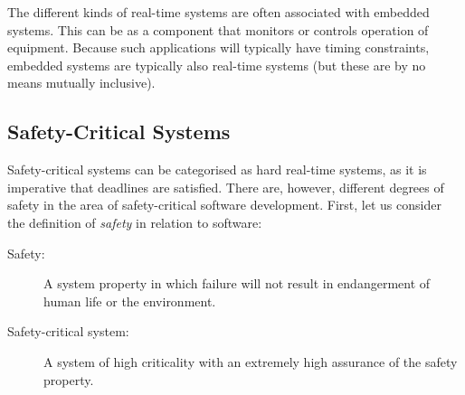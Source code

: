 The different kinds of real-time systems are often associated with embedded systems. This can be as a component that monitors or controls operation of equipment. Because such applications will typically have timing constraints, embedded systems are typically also real-time systems (but these are by no means mutually inclusive).

\subsection{Safety-Critical Systems} %
\label{sub:safety_critical_systems}
Safety-critical systems can be categorised as hard real-time systems, as it is imperative that deadlines are satisfied. There are, however, different degrees of safety in the area of safety-critical software development. First, let us consider the definition of \textit{safety} in relation to software\cite{SCJSpec}:
\begin{description}
	\item[Safety:] A system property in which failure will not result in endangerment of human life or the environment.
	\item[Safety-critical system:] A system of high criticality with an extremely high assurance of the safety property.
\end{description}


